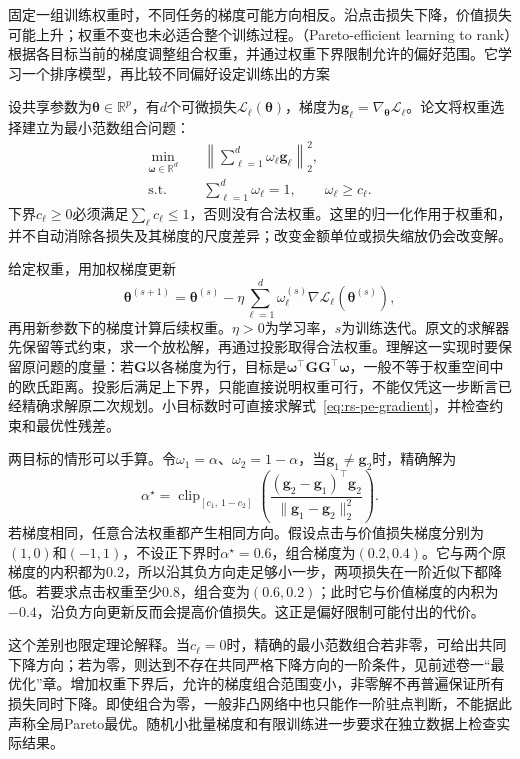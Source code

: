 固定一组训练权重时，不同任务的梯度可能方向相反。沿点击损失下降，价值损失可能上升；权重不变也未必适合整个训练过程。（Pareto-efficient learning to rank）根据各目标当前的梯度调整组合权重，并通过权重下界限制允许的偏好范围。它学习一个排序模型，再比较不同偏好设定训练出的方案

设共享参数为$\bm{\theta}\in\mathbb{R}^{p}$，有$d$个可微损失$\mathcal{L}_\ell(\bm{\theta})$，梯度为$\bm{g}_\ell=\nabla_{\bm{\theta}}\mathcal{L}_\ell$。论文将权重选择建立为最小范数组合问题：
\begin{equation}
 \begin{aligned}
  \min_{\bm{\omega}\in\mathbb{R}^{d}}\quad&
   \left\lVert\sum_{\ell=1}^{d}\omega_\ell\bm{g}_\ell
   \right\rVert_2^2,\\
  \text{s.t.}\quad&
   \sum_{\ell=1}^{d}\omega_\ell=1,\qquad
   \omega_\ell\geq c_\ell.
 \end{aligned}
 \label{eq:rs-pe-gradient}
\end{equation}
下界$c_\ell\geq0$必须满足$\sum_\ell c_\ell\leq1$，否则没有合法权重。这里的归一化作用于权重和，并不自动消除各损失及其梯度的尺度差异；改变金额单位或损失缩放仍会改变解。

给定权重，用加权梯度更新
\[
 \bm{\theta}^{(s+1)}
 =\bm{\theta}^{(s)}
  -\eta\sum_{\ell=1}^{d}\omega_\ell^{(s)}
       \nabla\mathcal{L}_\ell(\bm{\theta}^{(s)}),
\]
再用新参数下的梯度计算后续权重。$\eta>0$为学习率，$s$为训练迭代。原文的求解器先保留等式约束，求一个放松解，再通过投影取得合法权重。理解这一实现时要保留原问题的度量：若$\bm{G}$以各梯度为行，目标是$\bm{\omega}^{\top}\bm{G}\bm{G}^{\top}\bm{\omega}$，一般不等于权重空间中的欧氏距离。投影后满足上下界，只能直接说明权重可行，不能仅凭这一步断言已经精确求解原二次规划。小目标数时可直接求解式~\eqref{eq:rs-pe-gradient}，并检查约束和最优性残差。

两目标的情形可以手算。令$\omega_1=\alpha$、$\omega_2=1-\alpha$，当$\bm{g}_1\ne\bm{g}_2$时，精确解为
\[
 \alpha^\star=
 \operatorname{clip}_{[c_1,\,1-c_2]}
 \left(
 \frac{(\bm{g}_2-\bm{g}_1)^\top\bm{g}_2}
      {\lVert\bm{g}_1-\bm{g}_2\rVert_2^2}
 \right).
\]
若梯度相同，任意合法权重都产生相同方向。假设点击与价值损失梯度分别为$(1,0)$和$(-1,1)$，不设正下界时$\alpha^\star=0.6$，组合梯度为$(0.2,0.4)$。它与两个原梯度的内积都为0.2，所以沿其负方向走足够小一步，两项损失在一阶近似下都降低。若要求点击权重至少0.8，组合变为$(0.6,0.2)$；此时它与价值梯度的内积为$-0.4$，沿负方向更新反而会提高价值损失。这正是偏好限制可能付出的代价。

这个差别也限定理论解释。当$c_\ell=0$时，精确的最小范数组合若非零，可给出共同下降方向；若为零，则达到不存在共同严格下降方向的一阶条件，见前述卷一“最优化”章。增加权重下界后，允许的梯度组合范围变小，非零解不再普遍保证所有损失同时下降。即使组合为零，一般非凸网络中也只能作一阶驻点判断，不能据此声称全局Pareto最优。随机小批量梯度和有限训练进一步要求在独立数据上检查实际结果。


